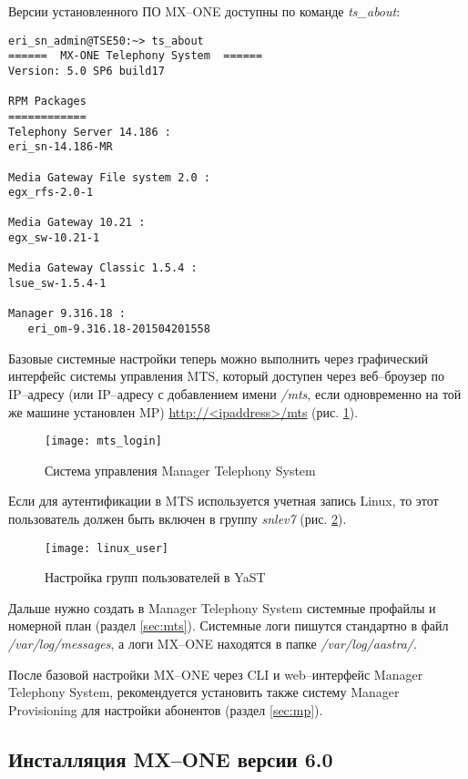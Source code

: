 Версии установленного ПО MX--ONE доступны по команде {\em ts\_about}:
\begin{lstlisting}
eri_sn_admin@TSE50:~> ts_about
======  MX-ONE Telephony System  ======
Version: 5.0 SP6 build17

RPM Packages
============
Telephony Server 14.186 :
eri_sn-14.186-MR

Media Gateway File system 2.0 :
egx_rfs-2.0-1

Media Gateway 10.21 :
egx_sw-10.21-1

Media Gateway Classic 1.5.4 :
lsue_sw-1.5.4-1

Manager 9.316.18 :
   eri_om-9.316.18-201504201558
\end{lstlisting}

Базовые системные настройки теперь можно выполнить через графический интерфейс системы управления MTS, который доступен через веб--броузер по IP--адресу (или IP--адресу с добавлением имени {\em /mts}, если одновременно на той же машине установлен MP) \url{http://<ipaddress>/mts} (рис. \ref{img:mts_login}).
\begin{figure}[!ht]
  \center
  \texttt{[image: mts\_login]}
  \caption{Система управления Manager Telephony System}
  \label{img:mts_login}
\end{figure}

Если для аутентификации в MTS используется учетная запись Linux, то этот пользователь должен быть включен в группу {\em snlev7} (рис. \ref{img:linux_user}).
\begin{figure}[!ht]
  \center
  \texttt{[image: linux\_user]}
  \caption{Настройка групп пользователей в YaST}
  \label{img:linux_user}
\end{figure}

Дальше нужно создать в Manager Telephony System системные профайлы и номерной план (раздел \ref{sec:mts}).
Системные логи пишутся стандартно в файл {\em /var/log/messages}, а логи MX--ONE находятся в папке {\em /var/log/aastra/}.

После базовой настройки MX--ONE через CLI и web--интерфейс Manager Telephony System, рекомендуется установить также систему Manager Provisioning для настройки абонентов (раздел \ref{sec:mp}). 

\clearpage

\subsection{Инсталляция MX--ONE версии 6.0}

